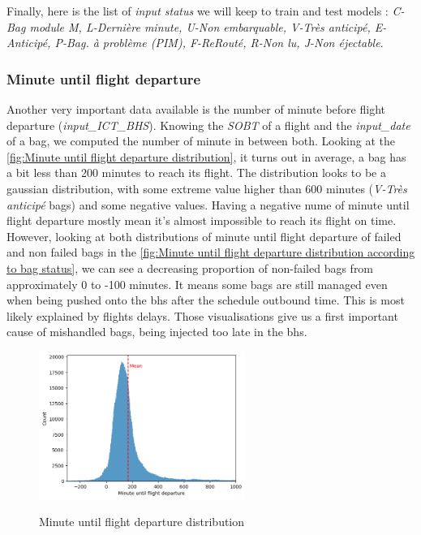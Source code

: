 \documentclass[12pt]{article}
\begin{document}
Finally, here is the list of \textit{input status} we will keep to train and test models : \textit{C-Bag module M, L-Dernière minute, U-Non embarquable, V-Très anticipé, E-Anticipé, P-Bag. à problème (PIM), F-ReRouté, R-Non lu, J-Non éjectable}.


\newpage
\subsubsection{Minute until flight departure}

Another very important data available is the number of minute before flight departure (\textit{input\_ICT\_BHS}). Knowing the \textit{SOBT} of a flight and the \textit{input\_date} of a bag, we computed the number of minute in between both. Looking at the \autoref{fig:Minute until flight departure distribution}, it turns out in average, a bag has a bit less than 200 minutes to reach its flight. The distribution looks to be a gaussian distribution, with some extreme value higher than 600 minutes (\textit{V-Très anticipé} bags) and some negative values. Having a negative nume of minute until flight departure mostly mean it's almost impossible to reach its flight on time. However, looking at both distributions of minute until flight departure of failed and non failed bags in the \autoref{fig:Minute until flight departure distribution according to bag status}, we can see a decreasing proportion of non-failed bags from approximately 0 to -100 minutes. It means some bags are still managed even when being pushed onto the \acrshort{bhs} after the schedule outbound time. This is most likely explained by flights delays. Those visualisations give us a first important cause of mishandled bags, being injected too late in the \acrshort{bhs}.

\begin{figure}[h]
    \centering
    \includegraphics[width=0.6\textwidth]{Minute until flight departure.png}\\
    \caption{Minute until flight departure distribution}
    \label{fig:Minute until flight departure distribution}
\end{figure}
\FloatBarrier
\end{document}
